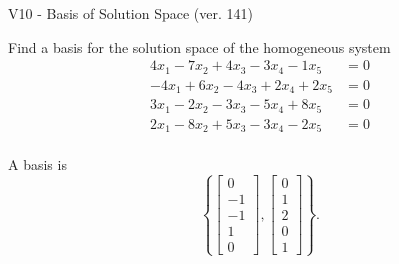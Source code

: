 \begin{exercise}
  \begin{exerciseTitle}V10 - Basis of Solution Space (ver. 141)\end{exerciseTitle}
  \begin{exerciseStatement}
    Find a basis for the solution space of the homogeneous system 
\begin{align*}
 4 x_ 1 -7 x_ 2 + 4 x_ 3 -3 x_ 4 -1 x_ 5 &= 0  \\ 
  -4 x_ 1 + 6 x_ 2 -4 x_ 3 + 2 x_ 4 + 2 x_ 5 &= 0  \\ 
  3 x_ 1 -2 x_ 2 -3 x_ 3 -5 x_ 4 + 8 x_ 5 &= 0  \\ 
  2 x_ 1 -8 x_ 2 + 5 x_ 3 -3 x_ 4 -2 x_ 5 &= 0  \\ 
 \end{align*}


 
  \end{exerciseStatement}

  \begin{exerciseAnswer}
   A basis is   
\[\left\{\left[\begin{array}{c}
0 \\
-1 \\
-1 \\
1 \\
0
\end{array}\right] , \left[\begin{array}{c}
0 \\
1 \\
2 \\
0 \\
1
\end{array}\right]\right\}.\]

  


  \end{exerciseAnswer}
\end{exercise}